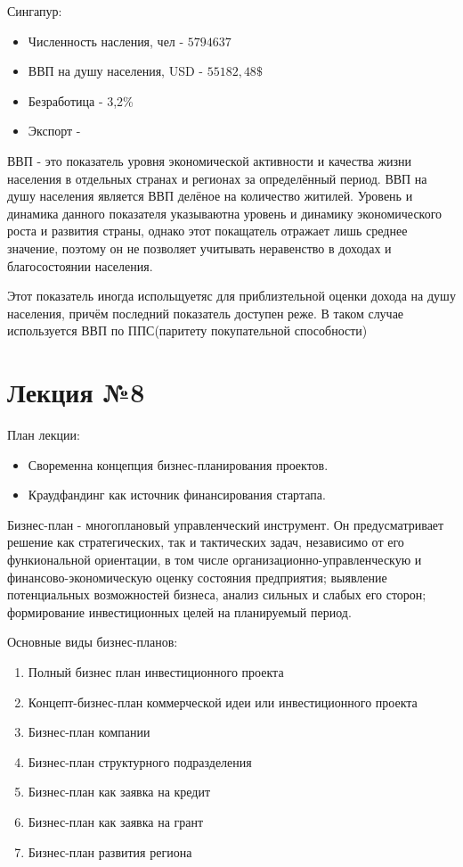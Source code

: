 \documentclass[a4paper, 12pt]{article}
\begin{document}
	Сингапур:
	\begin{itemize}
		\item Численность насления, чел - $5 794 637$
		\item ВВП на душу населения, USD - $55 182,48\$$
		\item Безработица - 3,2\%
		\item Экспорт - 
	\end{itemize}

	ВВП - это показатель уровня экономической активности и качества жизни населения в отдельных странах и регионах за определённый период. ВВП на душу населения является ВВП делёное на количество житилей. Уровень и динамика данного показателя указываютна уровень и динамику экономического роста и развития страны, однако этот покащатель отражает лишь среднее значение, поэтому он не позволяет учитывать неравенство в доходах и благосостоянии населения.
	
	Этот показатель иногда испольщуетяс для приблизтельной оценки дохода на душу населения, причём последний показатель доступен реже. В таком случае используется ВВП по ППС(паритету покупательной способности)
	
	\part{Лекция №8}
	
	План лекции:
	\begin{itemize}
		\item Своременна концепция бизнес-планирования проектов.
		\item Краудфандинг как источник финансирования стартапа.
	\end{itemize}
	
	Бизнес-план - многоплановый управленческий инструмент. Он предусматривает решение как стратегических, так и тактических задач, независимо от его функиональной ориентации, в том числе организационно-управленческую и финансово-экономическую оценку состояния предприятия; выявление потенциальных возможностей бизнеса, анализ сильных и слабых его сторон; формирование инвестиционных целей на планируемый период.
	
	Основные виды бизнес-планов:
	\begin{enumerate}
		\item Полный бизнес план инвестиционного проекта
		\item Концепт-бизнес-план коммерческой идеи или инвестиционного проекта
		\item Бизнес-план компании
		\item Бизнес-план структурного подразделения
		\item Бизнес-план как заявка на кредит
		\item Бизнес-план как заявка на грант
		\item Бизнес-план развития региона
	\end{enumerate}
\end{document}
